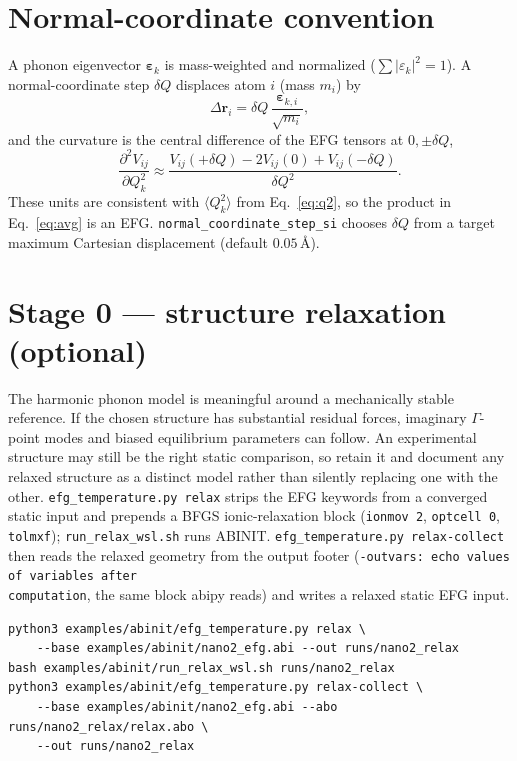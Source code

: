 \documentclass[11pt,oneside]{report}
\newcommand{\code}[1]{{\small\nolinkurl{#1}}}
\newcommand{\cmd}[1]{\texttt{\small #1}}
\begin{document}
\section{Normal-coordinate convention}
\label{sec:fd}

A phonon eigenvector $\boldsymbol\varepsilon_k$ is mass-weighted and normalized
($\sum |\varepsilon_k|^2 = 1$). A normal-coordinate step $\delta Q$ displaces atom
$i$ (mass $m_i$) by
\begin{equation}
\Delta \mathbf r_i = \delta Q\, \frac{\boldsymbol\varepsilon_{k,i}}{\sqrt{m_i}},
\end{equation}
and the curvature is the central difference of the EFG tensors at $0, \pm\delta Q$,
\begin{equation}
\frac{\partial^2 V_{ij}}{\partial Q_k^2} \approx
  \frac{V_{ij}(+\delta Q) - 2 V_{ij}(0) + V_{ij}(-\delta Q)}{\delta Q^2}.
\end{equation}
These units are consistent with $\langle Q_k^2\rangle$ from Eq.~\eqref{eq:q2}, so
the product in Eq.~\eqref{eq:avg} is an EFG.
\code{normal\_coordinate\_step\_si} chooses $\delta Q$ from a target maximum
Cartesian displacement (default $0.05$\,\AA).

\section{Stage 0 --- structure relaxation (optional)}
\label{sec:relax}

The harmonic phonon model is meaningful around a mechanically stable reference.
If the chosen structure has substantial residual forces, imaginary
$\Gamma$-point modes and biased equilibrium parameters can follow. An
experimental structure may still be the right static comparison, so retain it
and document any relaxed structure as a distinct model rather than silently
replacing one with the other. \cmd{efg\_temperature.py relax} strips the EFG
keywords from a converged static input and prepends a BFGS ionic-relaxation block
(\cmd{ionmov 2}, \cmd{optcell 0}, \code{tolmxf}); \code{run\_relax\_wsl.sh} runs
ABINIT. \cmd{efg\_temperature.py relax-collect} then reads the relaxed geometry
from the output footer (\code{-outvars: echo values of variables after
computation}, the same block abipy reads) and writes a relaxed static EFG input.

\begin{lstlisting}
python3 examples/abinit/efg_temperature.py relax \
    --base examples/abinit/nano2_efg.abi --out runs/nano2_relax
bash examples/abinit/run_relax_wsl.sh runs/nano2_relax
python3 examples/abinit/efg_temperature.py relax-collect \
    --base examples/abinit/nano2_efg.abi --abo runs/nano2_relax/relax.abo \
    --out runs/nano2_relax
\end{lstlisting}
\end{document}
